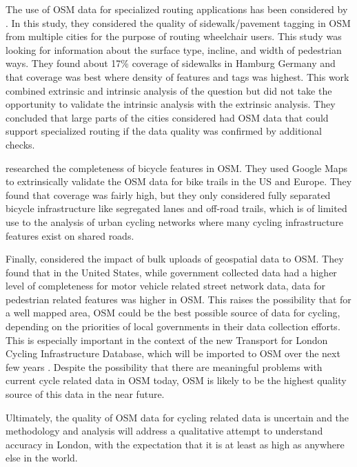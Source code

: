 The use of OSM data for specialized routing applications has been considered by \textcite{mobasheri2017crowdsourced}. In this study, they considered the quality of sidewalk/pavement tagging in OSM from multiple cities for the purpose of routing wheelchair users. This study was looking for information about the surface type, incline, and width of pedestrian ways. They found about 17\% coverage of sidewalks in Hamburg Germany and that coverage was best where density of features and tags was highest. This work combined extrinsic and intrinsic analysis of the question but did not take the opportunity to validate the intrinsic analysis with the extrinsic analysis. They concluded that large parts of the cities considered had OSM data that could support specialized routing if the data quality was confirmed by additional checks. 

\textcite{hochmair2013assessing} researched the completeness of bicycle features in OSM. They used Google Maps to extrinsically validate the OSM data for bike trails in the US and Europe. They found that coverage was fairly high, but they only considered fully separated bicycle infrastructure like segregated lanes and off-road trails, which is of limited use to the analysis of urban cycling networks where many cycling infrastructure features exist on shared roads. 

Finally, \textcite{zielstra2013assessing} considered the impact of bulk uploads of geospatial data to OSM. They found that in the United States, while government collected data had a higher level of completeness for motor vehicle related street network data, data for pedestrian related features was higher in OSM. This raises the possibility that for a well mapped area, OSM could be the best possible source of data for cycling, depending on the priorities of local governments in their data collection efforts. This is especially important in the context of the new Transport for London Cycling Infrastructure Database, which will be imported to OSM over the next few years \parencite{tflcid}. Despite the possibility that there are meaningful problems with current cycle related data in OSM today, OSM is likely to be the highest quality source of this data in the near future. 

Ultimately, the quality of OSM data for cycling related data is uncertain and the methodology and analysis will address a qualitative attempt to understand accuracy in London, with the expectation that it is at least as high as anywhere else in the world. 
